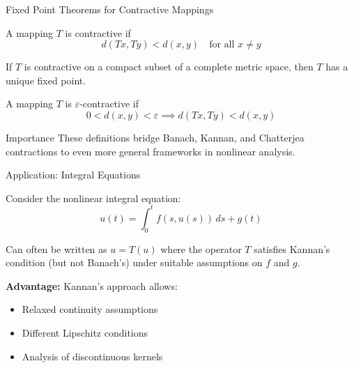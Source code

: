 \documentclass[aspectratio=169,10pt]{beamer}
\begin{document}
\begin{frame}{Fixed Point Theorems for Contractive Mappings}
    \begin{theorem}
        A mapping $T$ is contractive if
        \[
            d(Tx, Ty) < d(x, y) \quad \text{for all } x \neq y
        \]

        If $T$ is contractive on a compact subset of a complete metric space, then $T$ has
        a unique fixed point.
    \end{theorem}

    \vspace{0.2cm}
    \begin{definition}
        A mapping $T$ is $\varepsilon$-contractive if
        \[
            0 < d(x, y) < \varepsilon \implies d(Tx, Ty) < d(x, y)
        \]
    \end{definition}

    \vspace{0.2cm}
    \begin{block}{Importance}
        These definitions bridge Banach, Kannan, and Chatterjea contractions to even more
        general frameworks in nonlinear analysis.
    \end{block}
\end{frame}

\begin{frame}{Application: Integral Equations}
    \begin{example}
        Consider the nonlinear integral equation:
        \[
            u(t) = \int_0^t f(s, u(s)) \, ds + g(t)
        \]

        Can often be written as $u = T(u)$ where the operator $T$ satisfies Kannan's condition
        (but not Banach's) under suitable assumptions on $f$ and $g$.
    \end{example}

    \vspace{0.2cm}
    \textbf{Advantage:} Kannan's approach allows:
    \begin{itemize}
        \item Relaxed continuity assumptions
        \item Different Lipschitz conditions
        \item Analysis of discontinuous kernels
    \end{itemize}
\end{frame}

\end{document}
